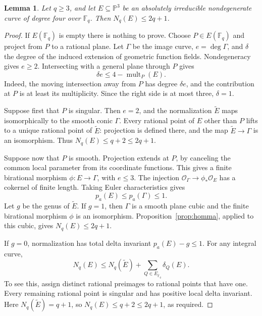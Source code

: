 \documentclass[11pt]{article}
\newtheorem{lemma}[theorem]{Lemma}
\theoremstyle{remark}\newtheorem{remark}[theorem]{Remark}
\newcommand{\F}{\mathbb F}
\newcommand{\PP}{\mathbb P}
\newcommand{\OO}{\mathcal O}
\newcommand{\Nq}{N_q}
\begin{document}
\begin{lemma}\label{lem:quartic}
Let $q\ge3$, and let $E\subseteq\PP^3$ be an absolutely irreducible nondegenerate curve of degree four over $\F_q$. Then $\Nq(E)\le2q+1$.
\end{lemma}
\begin{proof}
If $E(\F_q)$ is empty there is nothing to prove. Choose $P\in E(\F_q)$ and project from $P$ to a rational plane. Let $\Gamma$ be the image curve, $e=\deg\Gamma$, and $\delta$ the degree of the induced extension of geometric function fields. Nondegeneracy gives $e\ge2$. Intersecting with a general plane through $P$ gives
\begin{equation}\label{eq:projection}
 \delta e\le4-\operatorname{mult}_P(E).
\end{equation}
Indeed, the moving intersection away from $P$ has degree $\delta e$, and the contribution at $P$ is at least its multiplicity. Since the right side is at most three, $\delta=1$.

Suppose first that $P$ is singular. Then $e=2$, and the normalization $\widetilde E$ maps isomorphically to the smooth conic $\Gamma$. Every rational point of $E$ other than $P$ lifts to a unique rational point of $\widetilde E$: projection is defined there, and the map $\widetilde E\to\Gamma$ is an isomorphism. Thus $\Nq(E)\le q+2\le2q+1$.

Suppose now that $P$ is smooth. Projection extends at $P$, by canceling the common local parameter from its coordinate functions. This gives a finite birational morphism $\phi:E\to\Gamma$, with $e\le3$. The injection $\OO_\Gamma\to\phi_*\OO_E$ has a cokernel of finite length. Taking Euler characteristics gives
\[
 p_a(E)\le p_a(\Gamma)\le1.
\]
Let $g$ be the genus of $\widetilde E$. If $g=1$, then $\Gamma$ is a smooth plane cubic and the finite birational morphism $\phi$ is an isomorphism. Proposition~\ref{prop:homma}, applied to this cubic, gives $\Nq(E)\le2q+1$.

If $g=0$, normalization has total delta invariant $p_a(E)-g\le1$. For any integral curve,
\[
 \Nq(E)\le\Nq(\widetilde E)+\sum_{Q\in E_{\overline{\F}_q}}\delta_Q(E).
\]
To see this, assign distinct rational preimages to rational points that have one. Every remaining rational point is singular and has positive local delta invariant. Here $\Nq(\widetilde E)=q+1$, so $\Nq(E)\le q+2\le2q+1$, as required.
\end{proof}
\end{document}
